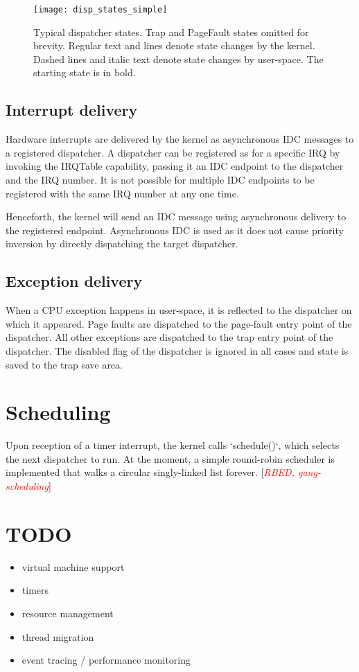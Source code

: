 \documentclass[a4paper,11pt,twoside]{report}
\newcommand{\todo}[1]{[\textcolor{red}{\emph{#1}}]}
\begin{document}
\begin{figure}
\centering
\texttt{[image: disp\_states\_simple]}
\caption[Typical dispatcher states]{Typical dispatcher states.
  Trap and PageFault states
  omitted for brevity. Regular text and lines denote state changes
  by the kernel. Dashed lines and italic text denote state changes
  by user-space. The starting state is in bold.}
\label{fig:dispstates}
\end{figure}

\subsection{Interrupt delivery}\label{sec:interrupts}

Hardware interrupts are delivered by the kernel as asynchronous IDC
messages to a registered dispatcher. A dispatcher can be registered
as for a specific IRQ by invoking the IRQTable capability,
passing it an IDC endpoint to the dispatcher and the IRQ
number. It is not possible for multiple IDC endpoints to be
registered with the same IRQ number at any one time.

Henceforth, the kernel will send an IDC message using asynchronous
delivery to the registered endpoint. Asynchronous
IDC is used as it does not cause priority inversion by directly
dispatching the target dispatcher.

\subsection{Exception delivery}

When a CPU exception happens in user-space, it is reflected to the
dispatcher on which it appeared. Page
faults are dispatched to the page-fault entry point of the
dispatcher. All other exceptions are dispatched to the trap entry
point of the dispatcher. The disabled flag of the dispatcher is
ignored in all cases and state is saved to the trap save area.

\section{Scheduling}

Upon reception of a timer interrupt, the kernel calls `schedule()`,
which selects the next dispatcher to run. At the moment, a simple
round-robin scheduler is implemented that walks a circular
singly-linked list forever.
\todo{RBED, gang-scheduling}

\section{TODO}
\begin{itemize}
\item virtual machine support
\item timers
\item resource management
\item thread migration
\item event tracing / performance monitoring
\end{itemize}
\end{document}
